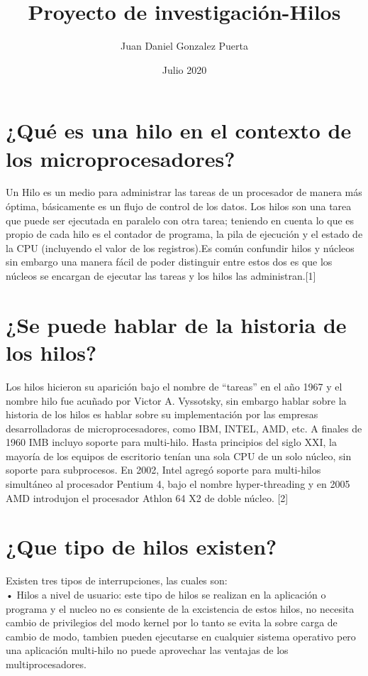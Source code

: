 \documentclass{article}
\title{Proyecto de investigación-Hilos}
\author{Juan Daniel Gonzalez Puerta}
\date{Julio 2020}
\begin{document}
\maketitle

\section*{¿Qué es una hilo en el contexto de los microprocesadores?
}
Un Hilo es un medio para administrar las tareas de un procesador de manera más óptima, básicamente es un flujo de control de los datos. Los hilos son una tarea que puede ser ejecutada en paralelo con otra tarea; teniendo en cuenta lo que es propio de cada hilo es el contador de programa, la pila de ejecución y el estado de la CPU (incluyendo el valor de los registros).Es común confundir hilos y núcleos sin embargo una manera fácil de poder distinguir entre estos dos es que los núcleos se encargan de ejecutar las tareas y los hilos las administran.[1]\\


\section*{¿Se puede hablar de la historia de los hilos?
}
Los hilos hicieron su aparición bajo el nombre de “tareas” en el año 1967 y el nombre hilo fue acuñado por Victor A. Vyssotsky, sin embargo hablar sobre la historia de los hilos es hablar sobre su implementación por las empresas desarrolladoras de microprocesadores, como IBM, INTEL, AMD, etc. A finales de 1960 IMB incluyo soporte para multi-hilo. Hasta principios del siglo XXI, la mayoría de los equipos de escritorio tenían una sola CPU de un solo núcleo, sin soporte para subprocesos. En 2002, Intel agregó soporte para multi-hilos simultáneo al procesador Pentium 4, bajo el nombre hyper-threading y en 2005 AMD introdujon el procesador Athlon 64 X2 de doble núcleo. [2]\\


\section*{¿Que tipo de hilos existen?}
Existen tres tipos de interrupciones, las cuales son:\\

•	Hilos a nivel de usuario: este tipo de hilos se realizan en la aplicación o programa y el nucleo no es consiente de la excistencia de estos hilos, no necesita cambio de privilegios del modo kernel por lo tanto se evita la sobre carga de cambio de modo, tambien pueden ejecutarse en cualquier sistema operativo pero una aplicación multi-hilo no puede aprovechar las ventajas de los multiprocesadores.\\
\end{document}
